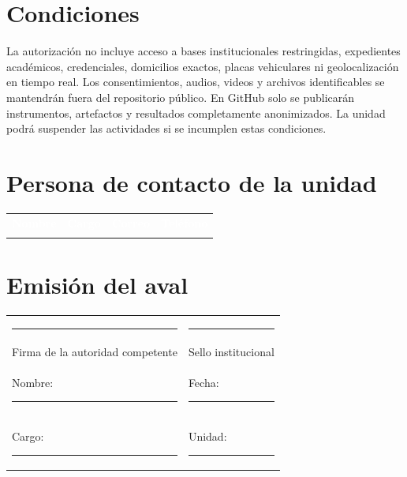 \documentclass[11pt,a4paper]{article}
\begin{document}
\section{Condiciones}

La autorización no incluye acceso a bases institucionales restringidas, expedientes académicos, credenciales, domicilios exactos, placas vehiculares ni geolocalización en tiempo real. Los consentimientos, audios, videos y archivos identificables se mantendrán fuera del repositorio público. En GitHub solo se publicarán instrumentos, artefactos y resultados completamente anonimizados. La unidad podrá suspender las actividades si se incumplen estas condiciones.

\section{Persona de contacto de la unidad}

\noindent
{}
\begin{tabularx}{\textwidth}{Y L{3.5cm} L{4.2cm} L{3.1cm}}
\textcolor{white}{\textbf{Nombre}} &
\textcolor{white}{\textbf{Cargo}} &
\textcolor{white}{\textbf{Correo}} &
\textcolor{white}{\textbf{Teléfono}}\\
\rule{0pt}{0.75cm}\hrulefill & \hrulefill & \hrulefill & \hrulefill \\
\end{tabularx}

\section{Emisión del aval}

\vspace{0.85cm}
\noindent
\begin{tabularx}{\textwidth}{Y Y}
\centering\rule{5.7cm}{0.4pt} & \centering\arraybackslash\rule{5.7cm}{0.4pt}\\
\centering Firma de la autoridad competente & \centering\arraybackslash Sello institucional\\[6pt]
\centering Nombre: \rule{3.4cm}{0.4pt} & \centering\arraybackslash Fecha: \rule{3.4cm}{0.4pt}\\[6pt]
\centering Cargo: \rule{3.7cm}{0.4pt} & \centering\arraybackslash Unidad: \rule{3.3cm}{0.4pt}
\end{tabularx}
\end{document}
